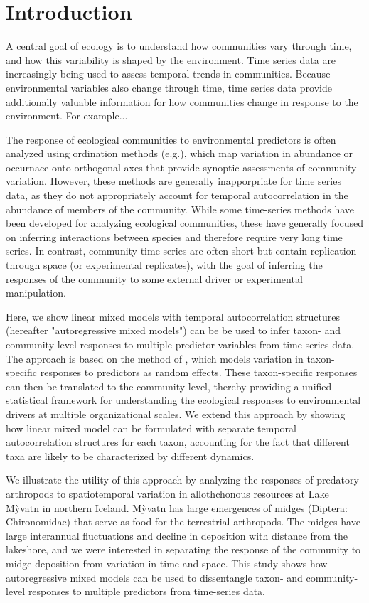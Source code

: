 

\section*{Introduction}


A central goal of ecology is to understand how communities vary through time, and
how this variability is shaped by the environment.
Time series data are increasingly being used to assess temporal trends in communities.
Because environmental variables also change through time, time series data provide
additionally valuable information for how communities change in response to the
environment. For example...

The response of ecological communities to environmental predictors is often analyzed using
ordination methods (e.g.), which map variation in abundance or occurnace onto orthogonal
axes that provide synoptic assessments of community variation. However, these methods
are generally inapporpriate for time series data, as they do not appropriately account
for temporal autocorrelation in the abundance of members of the community.
While some time-series methods have been developed for analyzing ecological communities,
these have generally focused on inferring interactions between species and therefore
require very long time series. In contrast, community time series are often short but
contain replication through space (or experimental replicates), with the goal of inferring
the responses of the community to some external driver or experimental manipulation.

Here, we show linear mixed models with temporal autocorrelation structures
(hereafter "autoregressive mixed  models") can be be used to infer taxon- and
community-level responses to multiple predictor variables from time series data. The
approach is based on the method of \cite{Jackson2012}, which models variation in
taxon-specific responses to predictors as random effects. These taxon-specific responses
can then be translated to the community level, thereby providing a unified statistical
framework for understanding the ecological responses to environmental drivers at multiple
organizational scales. We extend this approach by showing how linear mixed model can be
formulated with separate temporal autocorrelation structures for each taxon,
accounting for the fact that different taxa are likely to be characterized by
different dynamics.

We illustrate the utility of this approach by analyzing the responses of predatory
arthropods to spatiotemporal variation in allothchonous resources
at Lake M\`{y}vatn in northern Iceland. M\`{y}vatn has large emergences of midges
(Diptera: Chironomidae) that serve as food for the terrestrial arthropods.
The midges have large interannual fluctuations and decline in deposition
with distance from the lakeshore, and we were interested in separating the response
of the community to midge deposition from variation in time and space.
This study shows how autoregressive mixed models can be used to dissentangle
taxon- and community-level responses to multiple predictors from time-series data.






